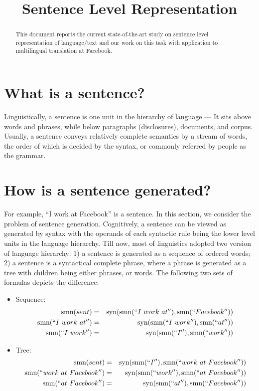 \documentclass{article} %
\title{Sentence Level Representation}
\begin{document}
\maketitle

\begin{abstract}
This document reports the current state-of-the-art study on sentence level
representation of language/text and our work on this task with application
to multilingual translation at Facebook.
\end{abstract}

\section{What is a sentence?}
Linguistically, a sentence is one unit in the hierarchy of language --- It sits
above words and phrases, while below paragraphs (disclosures), documents, and
corpus. Usually, a sentence conveys relatively complete semantics by a stream of
words, the order of which is decided by the syntax, or commonly referred by
people as the grammar.

\section{How is a sentence generated?}
For example, ``I work at Facebook'' is a sentence. In this section, we consider
the problem of sentence generation.
Cognitively, a sentence can be viewed as generated by syntax with the operands
of each syntactic rule being the lower level units in the language hierarchy.
Till now, most of linguistics adopted two version of language hierarchy: 1)
a sentence is generated as a sequence of ordered words; 2) a sentence is a
syntactical complete phrase, where a phrase is generated as a tree with
children being either phrases, or words. The following two sets of formulas
depicts the difference:

\begin{itemize}
\item Sequence:
	\begin{eqnarray}
	\textrm{smn}(sent) &=& \textrm{syn}(\textrm{smn}(``I~work~at''),
\textrm{smn}(``Facebook'')) \\
	\textrm{smn}(``I~work~at'') &=& \textrm{syn}(\textrm{smn}(``I~work''),
\textrm{smn}(``at''))	\nonumber \\
	\textrm{smn}(``I~work'') &=& \textrm{syn}(\textrm{smn}(``I''),
\textrm{smn}(``work''))	\nonumber
	\end{eqnarray}
\item Tree:
	\begin{eqnarray}
	\textrm{smn}(sent) &=& \textrm{syn}(\textrm{smn}(``I''),
\textrm{smn}(``work~at~Facebook'')) \\
	\textrm{smn}(``work~at~Facebook'') &=& \textrm{syn}(\textrm{smn}(``work''),
\textrm{smn}(``at~Facebook''))	\nonumber \\
	\textrm{smn}(``at~Facebook'') &=& \textrm{syn}(\textrm{smn}(``at''),
\textrm{smn}(``Facebook''))	\nonumber
	\end{eqnarray}
\end{itemize}
\end{document}

